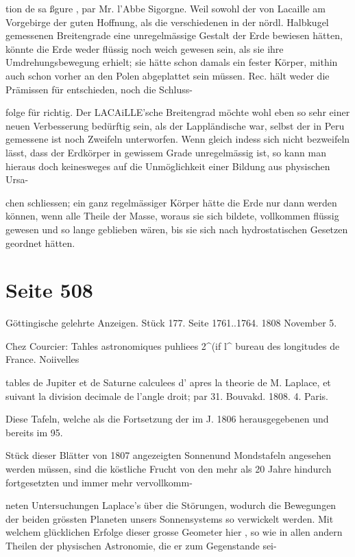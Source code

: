 \documentclass[10pt,a4paper]{article}
\begin{document}
tion de sa ßgure , par Mr. l'Abbe Sigorgne. Weil sowohl der von Lacaille am Vorgebirge der guten Hoffnung, als die verschiedenen in der nördl. Halbkugel gemessenen Breitengrade eine unregelmässige Gestalt der Erde bewiesen hätten, könnte die Erde weder flüssig noch weich gewesen sein, als sie ihre Umdrehungsbewegung erhielt; sie hätte schon damals ein fester Körper, mithin auch schon vorher an den Polen abgeplattet sein müssen. Rec. hält weder die Prämissen für entschieden, noch die Schluss-

folge für richtig. Der LACAiLLE'sche Breitengrad möchte wohl eben so sehr einer neuen Verbesserung bedürftig sein, als der Lappländische war, selbst der in Peru gemessene ist noch Zweifeln unterworfen. Wenn gleich indess sich nicht bezweifeln lässt, dass der Erdkörper in gewissem Grade unregelmässig ist, so kann man hieraus doch keinesweges auf die Unmöglichkeit einer Bildung aus physischen Ursa-

chen schliessen; ein ganz regelmässiger Körper hätte die Erde nur dann werden können, wenn alle Theile der Masse, woraus sie sich bildete, vollkommen flüssig gewesen und so lange geblieben wären, bis sie sich nach hydrostatischen Gesetzen geordnet hätten.


\newpage
\section*{Seite 508}
Göttingische gelehrte Anzeigen. Stück 177. Seite 1761..1764. 1808 November 5.

Chez Courcier: Tahles astronomiques puhliees 2\textasciicircum{}(if l\textasciicircum{} bureau des longitudes de France. Noiivelles

tables de Jupiter et de Saturne calculees d' apres la theorie de M. Laplace, et suivant la division decimale de l'angle droit; par 31. Bouvakd. 1808. 4. Paris.

Diese Tafeln, welche als die Fortsetzung der im J. 1806 herausgegebenen und bereits im 95.

Stück dieser Blätter von 1807 angezeigten Sonnenund Mondstafeln angesehen werden müssen, sind die köstliche Frucht von den mehr als 20 Jahre hindurch fortgesetzten und immer mehr vervollkomm-

neten Untersuchungen Laplace's über die Störungen, wodurch die Bewegungen der beiden grössten Planeten unsers Sonnensystems so verwickelt werden. Mit welchem glücklichen Erfolge dieser grosse Geometer hier , so wie in allen andern Theilen der physischen Astronomie, die er zum Gegenstande sei-
\end{document}
